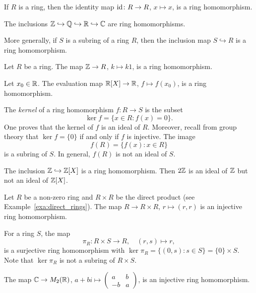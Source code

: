 If $R$ is a ring, then  
the identity map $\operatorname{id}\colon R\to R$, $x\mapsto x$, is a ring homomorphism. 	

\begin{example}
The inclusions $\mathbb{Z}\hookrightarrow\mathbb{Q}\hookrightarrow\mathbb{R}\hookrightarrow\mathbb{C}$ 
are ring homomorphisms. 	
\end{example}

More generally, if $S$ is a subring of a ring $R$, then the inclusion map 
$S\hookrightarrow R$ is a ring homomorphism. 

\begin{example}
Let $R$ be a ring. 
The map $\mathbb{Z}\to R$, $k\mapsto k1$, is a ring homomorphism. 	
\end{example}

\begin{example}
  Let $x_0\in\mathbb{R}$. The evaluation map $\mathbb{R}[X]\to\mathbb{R}$, $f\mapsto f(x_0)$, 
  is a ring homomorphism. 	
\end{example}

The \emph{kernel} of a ring homomorphism
$f\colon R\to S$ is the subset
\[
\ker f=\{x\in R:f(x)=0\}.
\]
One proves that the kernel of $f$ is an ideal of $R$.  
Moreover, recall from group theory that 
$\ker f=\{0\}$ if and only if $f$ is injective. The image 
\[
f(R)=\{f(x):x\in R\}
\]
is a subring of $S$. In general, $f(R)$ is not an ideal of $S$. 

\begin{example}
The inclusion $\mathbb{Z}\hookrightarrow\mathbb{Z}[X]$ is a ring homomorphism. Then
$2\mathbb{Z}$ is an ideal of $\mathbb{Z}$ but not an ideal of $\mathbb{Z}[X]$. 
\end{example}

\begin{example}
    Let $R$ be a non-zero ring and $R\times R$ be the direct product (see
    Example~\ref{exa:direct_rings}).  The map $R\to R\times R$, $r\mapsto
    (r,r)$ is an injective ring homomorphism. 

    For a ring $S$, the map 
    \[
    \pi_R\colon R\times S\to R,\quad (r,s)\mapsto r,
    \]
    is a surjective ring homomorphism with $\ker\pi_R=\{(0,s):s\in
    S\}=\{0\}\times S$. Note that $\ker\pi_R$ is not a subring of $R\times S$.
\end{example}

\begin{example}
  The map $\mathbb{C}\to M_2(\mathbb{R})$, $a+bi\mapsto\begin{pmatrix}a&b\\-b&a\end{pmatrix}$,
  is an injective ring homomorphism. 	
\end{example}

